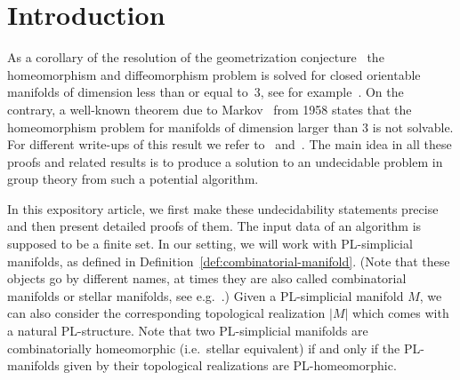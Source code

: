 \documentclass[a4paper, reqno]{amsart}
\theoremstyle{definition}
\theoremstyle{remark}
\renewcommand{\~}{\nobreak\ }
\begin{document}
\section{Introduction}

As a corollary of the resolution of the geometrization conjecture\~\cite{perelman1,perelman2} the homeomorphism and diffeomorphism problem is solved for closed orientable manifolds of dimension less than or equal to\~$3$, see for example\~\cite{Kuperberg}. %
On the contrary, a well-known theorem due to Markov\~\cite{Markov} from 1958 states that the homeomorphism problem for manifolds of dimension larger than $3$ is not solvable. For different write-ups of this result we refer to\~\cite{Stanko, Chernavsky,Kirby_Markovsthm,Gordon,Tancer,BooneHakenPoenaru} and\~\cite[Exercises\~5.1.10(c),\~5.2.2(c)]{GS}. The main idea in all these proofs and related results is to produce a solution to an undecidable problem in group theory from such a potential algorithm. 

In this expository article, we first make these undecidability statements precise and then present detailed proofs of them.
The input data of an algorithm is supposed to be a finite set. In our setting, we will work with PL-simplicial manifolds, as defined in Definition\~\ref{def:combinatorial-manifold}. (Note that these objects go by different names, at times they are also called combinatorial manifolds or stellar manifolds, see e.g.\ \cite{Glaser}.) 
Given a PL-simplicial manifold $M$, we can also consider the corresponding topological realization $|M|$ which comes with a natural PL-structure. Note that two PL-simplicial manifolds are combinatorially homeomorphic (i.e.\ stellar equivalent) if and only if the PL-manifolds given by their topological realizations are PL-homeomorphic.
%
\end{document}
